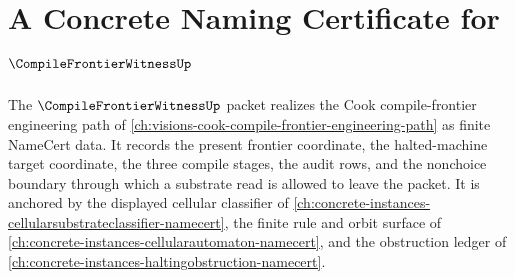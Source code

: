 \chapter{A Concrete Naming Certificate for $\CompileFrontierWitnessUp$}
\label{ch:concrete-instances-compilefrontierwitness-namecert}

The $\CompileFrontierWitnessUp$ packet realizes the Cook compile-frontier engineering path of \autoref{ch:visions-cook-compile-frontier-engineering-path} as finite NameCert data. It records the present frontier coordinate, the halted-machine target coordinate, the three compile stages, the audit rows, and the nonchoice boundary through which a substrate read is allowed to leave the packet. It is anchored by the displayed cellular classifier of \autoref{ch:concrete-instances-cellularsubstrateclassifier-namecert}, the finite rule and orbit surface of \autoref{ch:concrete-instances-cellularautomaton-namecert}, and the obstruction ledger of \autoref{ch:concrete-instances-haltingobstruction-namecert}.



